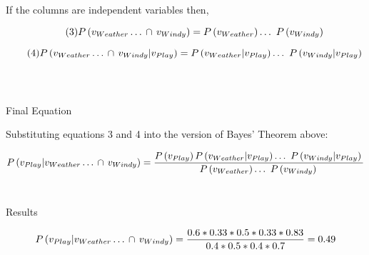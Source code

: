 \documentclass{article}
\begin{document}
%
%

If the columns are independent variables then,
	
	\begin{equation} \tag{3}
		\nonumber P \left( \vand \right) =  \vprobs{}
	\end{equation}
	
	\begin{equation} \tag{4}
		\nonumber P \left( \vand{} |  v_{Play} \right) = \vbarprobs{}
	\end{equation} \\ \\
	
%
%
\begin{center} Final Equation \end{center}

Substituting equations 3 and 4 into the version of Bayes' Theorem above:

\begin{equation}
		\nonumber P \left( v_{Play} | \vand{} \right) 
		= \frac{ P  \left(  v_{Play} \right) \vbarprobs{}}{ \vprobs{}}
\end{equation} \\

\begin{center} Results \end{center}
\begin{equation}
		\nonumber P \left( v_{Play} | \vand{} \right) 
		= \frac{ 0.6 * 0.33 * 0.5 * 0.33 * 0.83 }{ 0.4 * 0.5 * 0.4 * 0.7} = 0.49
\end{equation}
\end{document}
